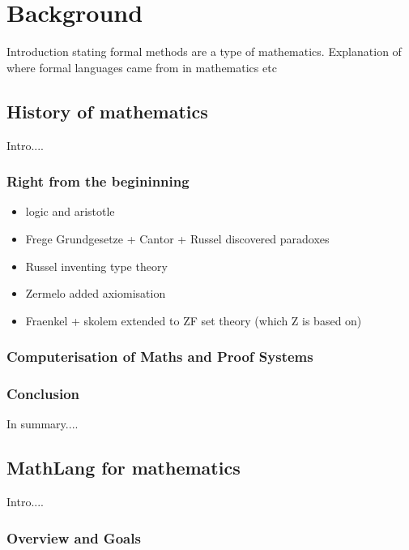 \chapter{Background}
\label{ch:background}

Introduction stating formal methods are a type of mathematics. Explanation of where formal languages came from in mathematics etc

\section{History of mathematics}

Intro....

\subsection{Right from the begininning}

\begin{itemize}
\item logic and aristotle

\item Frege Grundgesetze + Cantor + Russel discovered paradoxes

\item Russel inventing type theory

\item Zermelo added axiomisation

\item Fraenkel + skolem extended to ZF set theory (which Z is based on)

\end{itemize}

\subsection{Computerisation of Maths and Proof Systems}



\subsection{Conclusion}

In summary....

\section{MathLang for mathematics}

Intro....

\subsection{Overview and Goals}

